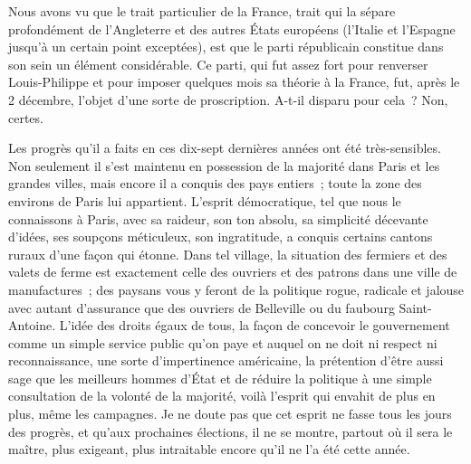 \documentclass[french,twoside]{book} %
\begin{document}
\noindent Nous avons vu que le trait particulier de la France, trait qui la sépare profondément de l’Angleterre et des autres États européens (l’Italie et l’Espagne jusqu’à un certain point exceptées), est que le parti républicain constitue dans son sein un élément considérable. Ce parti, qui fut assez fort pour renverser Louis-Philippe et pour imposer quelques mois sa théorie à la France, fut, après le 2 décembre, l’objet d’une sorte de proscription. A-t-il disparu pour cela ? Non, certes.\par
Les progrès qu’il a faits en ces dix-sept dernières années ont été très-sensibles. Non seulement il s’est maintenu en possession de la majorité dans Paris et les grandes villes, mais encore il a conquis des pays entiers ; toute la zone des environs de Paris lui appartient. L’esprit démocratique, tel que nous le connaissons à Paris, avec sa raideur, son ton absolu, sa simplicité décevante d’idées, ses soupçons méticuleux, son ingratitude, a conquis certains cantons ruraux d’une façon qui étonne. Dans tel village, la situation des fermiers et des valets de ferme est exactement celle des ouvriers et des patrons dans une ville de manufactures ; des paysans vous y feront de la politique rogue, radicale et jalouse avec autant d’assurance que des ouvriers de Belleville ou du faubourg Saint-Antoine. L’idée des droits égaux de tous, la façon de concevoir le gouvernement comme un simple service public qu’on paye et auquel on ne doit ni respect ni reconnaissance, une sorte d’impertinence américaine, la prétention d’être aussi sage que les meilleurs hommes d’État et de réduire la politique à une simple consultation de la volonté de la majorité, voilà l’esprit qui envahit de plus en plus, même les campagnes. Je ne doute pas que cet esprit ne fasse tous les jours des progrès, et qu’aux prochaines élections, il ne se montre, partout où il sera le maître, plus exigeant, plus intraitable encore qu’il ne l’a été cette année.\par
\end{document}
